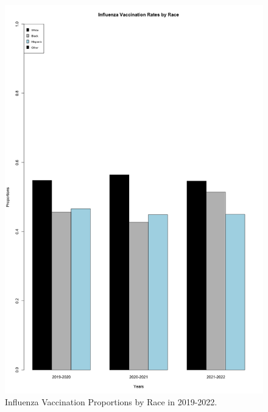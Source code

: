 \documentclass[12pt]{article}
\begin{document}
\begin{figure}[ht!]
  \centering
  \includegraphics[width= 125mm ,scale=.75]{race.png}
  \caption{Influenza Vaccination Proportions by Race in 2019-2022.}
  \label{fig:race}
\end{figure}
\end{document}
